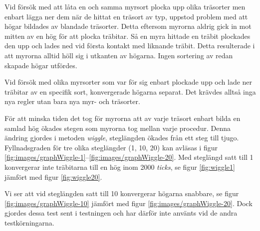 \documentclass[titlepage, a4paper, 12pt]{article}
\begin{document}
Vid försök med att låta en och samma myrsort plocka upp olika
träsorter men enbart lägga ner dem när de hittat en träsort av typ,
uppstod problem med att högar bildades av blandade träsorter. Detta
eftersom myrorna aldrig gick in mot mitten av en hög för att plocka
träbitar. Så en myra hittade en träbit plockades den upp och lades ned
vid första kontakt med liknande träbit. Detta resulterade i att
myrorna alltid höll sig i utkanten av högarna. Ingen sortering av
redan skapade högar utfördes.

Vid försök med olika myrsorter som var för sig enbart plockade upp och
lade ner träbitar av en specifik sort, konvergerade högarna
separat. %
Det krävdes alltså inga nya regler utan bara nya myr- och
träsorter.

För att minska tiden det tog för myrorna att av varje träsort enbart
bilda en samlad hög ökades stegen som myrorna tog mellan varje
procedur. Denna ändring gjordes i metoden \textit{wiggle}, steglängden
ökades från ett steg till tjugo. Fyllnadsgraden för tre olika
steglängder (1, 10, 20) kan avläsas i figur
\ref{fig:images/graphWiggle-1}–\ref{fig:images/graphWiggle-20}.  Med
steglängd satt till 1 konvergerar inte träbitarna till en hög inom
2000 \textit{ticks}, se figur \ref{fig:wiggle1} jämfört med figur
\ref{fig:wiggle20}.

Vi ser att vid steglängden satt till 10 konvergerar högarna snabbare,
se figur \ref{fig:images/graphWiggle-10} jämfört med figur
\ref{fig:images/graphWiggle-20}. Dock gjordes dessa test sent i
testningen och har därför inte använts vid de andra testkörningarna.
\end{document}
